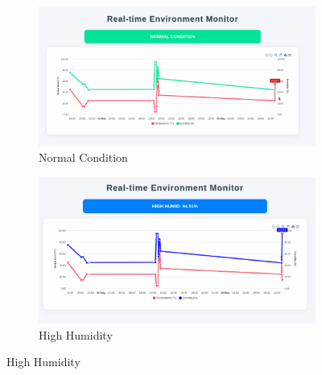 \documentclass[12pt,a4paper]{article}
\begin{document}
\begin{figure}[h!]
  \centering
  \begin{subfigure}[b]{0.46\textwidth}
      \includegraphics[width=\textwidth]{figures/1.png}
      \caption{Normal Condition}
      \label{fig:sub1}
  \end{subfigure}
  \hfill
  \begin{subfigure}[b]{0.46\textwidth}
      \includegraphics[width=\textwidth]{figures/2.png}
      \caption{High Humidity}
      \label{fig:sub2}
  \end{subfigure}
  
  \vspace{0.5cm} %
  

\end{figure}
\end{document}
